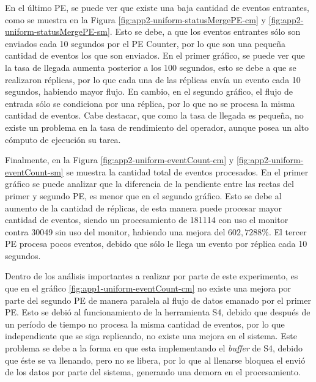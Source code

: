 En el último PE, se puede ver que existe una baja cantidad de eventos entrantes, como se muestra en la Figura \ref{fig:app2-uniform-statusMergePE-cm} y \ref{fig:app2-uniform-statusMergePE-sm}. Esto se debe, a que los eventos entrantes sólo son enviados cada 10 segundos por el PE Counter, por lo que son una pequeña cantidad de eventos los que son enviados. En el primer gráfico, se puede ver que la tasa de llegada aumenta posterior a los 100 segundos, esto se debe a que se realizaron réplicas, por lo que cada una de las réplicas envía un evento cada 10 segundos, habiendo mayor flujo. En cambio, en el segundo gráfico, el flujo de entrada sólo se condiciona por una réplica, por lo que no se procesa la misma cantidad de eventos. Cabe destacar, que como la tasa de llegada es pequeña, no existe un problema en la tasa de rendimiento del operador, aunque posea un alto cómputo de ejecución su tarea.

Finalmente, en la Figura \ref{fig:app2-uniform-eventCount-cm} y \ref{fig:app2-uniform-eventCount-sm} se muestra la cantidad total de eventos procesados. En el primer gráfico se puede analizar que la diferencia de la pendiente entre las rectas del primer y segundo PE, es menor que en el segundo gráfico. Esto se debe al aumento de la cantidad de réplicas, de esta manera puede procesar mayor cantidad de eventos, siendo un procesamiento de 181114 con uso el monitor contra 30049 sin uso del monitor, habiendo una mejora del $602,7288\%$. El tercer PE procesa pocos eventos, debido que sólo le llega un evento por réplica cada 10 segundos.

Dentro de los análisis importantes a realizar por parte de este experimento, es que en el gráfico \ref{fig:app1-uniform-eventCount-cm} no existe una mejora por parte del segundo PE de manera paralela al flujo de datos emanado por el primer PE. Esto se debió al funcionamiento de la herramienta S4, debido que después de un período de tiempo no procesa la misma cantidad de eventos, por lo que independiente que se siga replicando, no existe una mejora en el sistema. Este problema se debe a la forma en que esta implementando el \textit{buffer} de S4, debido que éste se va llenando, pero no se libera, por lo que al llenarse bloquea el envió de los datos por parte del sistema, generando una demora en el procesamiento.

